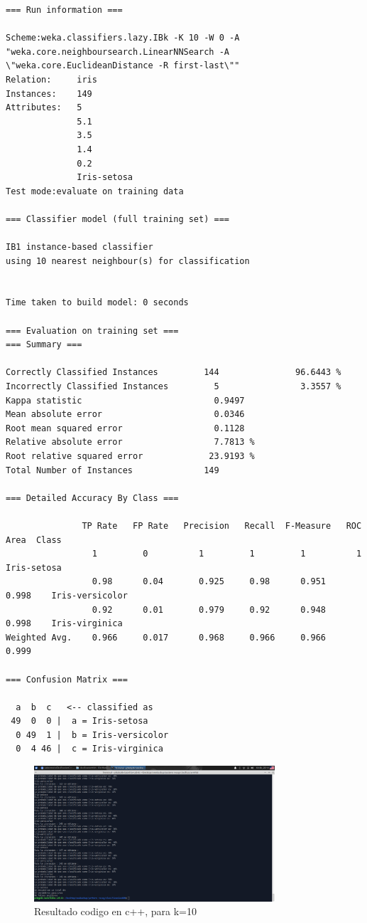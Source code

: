 \documentclass[12pt,letterpaper]{article}
\begin{document}
\begin{lstlisting}
=== Run information ===

Scheme:weka.classifiers.lazy.IBk -K 10 -W 0 -A "weka.core.neighboursearch.LinearNNSearch -A \"weka.core.EuclideanDistance -R first-last\""
Relation:     iris
Instances:    149
Attributes:   5
              5.1
              3.5
              1.4
              0.2
              Iris-setosa
Test mode:evaluate on training data

=== Classifier model (full training set) ===

IB1 instance-based classifier
using 10 nearest neighbour(s) for classification


Time taken to build model: 0 seconds

=== Evaluation on training set ===
=== Summary ===

Correctly Classified Instances         144               96.6443 %
Incorrectly Classified Instances         5                3.3557 %
Kappa statistic                          0.9497
Mean absolute error                      0.0346
Root mean squared error                  0.1128
Relative absolute error                  7.7813 %
Root relative squared error             23.9193 %
Total Number of Instances              149     

=== Detailed Accuracy By Class ===

               TP Rate   FP Rate   Precision   Recall  F-Measure   ROC Area  Class
                 1         0          1         1         1          1        Iris-setosa
                 0.98      0.04       0.925     0.98      0.951      0.998    Iris-versicolor
                 0.92      0.01       0.979     0.92      0.948      0.998    Iris-virginica
Weighted Avg.    0.966     0.017      0.968     0.966     0.966      0.999

=== Confusion Matrix ===

  a  b  c   <-- classified as
 49  0  0 |  a = Iris-setosa
  0 49  1 |  b = Iris-versicolor
  0  4 46 |  c = Iris-virginica
\end{lstlisting}
\begin{figure}[H]
    \centering
    \includegraphics[width=0.8\textwidth]{knnc++10.jpg}
    \caption{Resultado codigo en c++, para k=10}
    \label{fig:10}
\end{figure}
\end{document}
